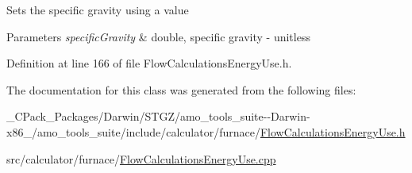 Sets the specific gravity using a value


\begin{DoxyParams}{Parameters}
{\em specific\+Gravity} & double, specific gravity -\/ unitless \\
\hline
\end{DoxyParams}


Definition at line 166 of file Flow\+Calculations\+Energy\+Use.\+h.



The documentation for this class was generated from the following files\+:\begin{DoxyCompactItemize}
\item 
\+\_\+\+C\+Pack\+\_\+\+Packages/\+Darwin/\+S\+T\+G\+Z/amo\+\_\+tools\+\_\+suite-\/-\/\+Darwin-\/x86\+\_/amo\+\_\+tools\+\_\+suite/include/calculator/furnace/\hyperlink{___c_pack___packages_2_darwin_2_s_t_g_z_2amo__tools__suite--_darwin-x86__64_2amo__tools__suite_2aa662891a85863ab2a5643413f77ebfb}{Flow\+Calculations\+Energy\+Use.\+h}\item 
src/calculator/furnace/\hyperlink{_flow_calculations_energy_use_8cpp}{Flow\+Calculations\+Energy\+Use.\+cpp}\end{DoxyCompactItemize}

